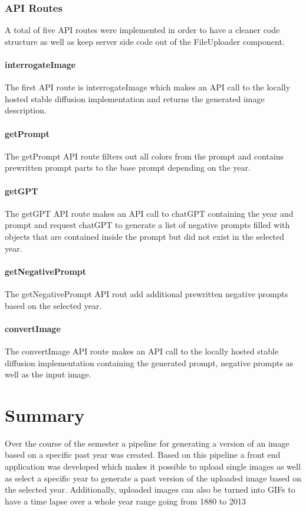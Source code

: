 \documentclass[english,notitlepage,smartquotes]{hgbreport}
\begin{document}
\subsection{API Routes}
\label{apiRoutes}
A total of five API routes were implemented in order to have a cleaner code structure as well as keep server side code out of the FileUploader component.
\subsubsection{interrogateImage}
The first API route is interrogateImage which makes an API call to the locally hosted stable diffusion implementation and returns the generated image description.
\subsubsection{getPrompt}
The getPrompt API route filters out all colors from the prompt and contains prewritten prompt parts to the base prompt depending on the year.
\subsubsection{getGPT}
The getGPT API route makes an API call to chatGPT containing the year and prompt and request chatGPT to generate a list of negative prompts filled with objects that are contained inside the prompt but did not exist in the selected year.
\subsubsection{getNegativePrompt}
The getNegativePrompt API rout add additional prewritten negative prompts based on the selected year.
\subsubsection{convertImage}
The convertImage API route makes an API call to the locally hosted stable diffusion implementation containing the generated prompt, negative prompts as well as the input image.

\chapter{Summary}

Over the course of the semester a pipeline for generating a version of an image based on a specific past year was created.
Based on this pipeline a front end application was developed which makes it possible to upload single images as well as select a specific year to generate a past version of the uploaded image based on the selected year.
Additionally, uploaded images can also be turned into GIFs to have a time lapse over a whole year range going from 1880 to 2013
\end{document}
